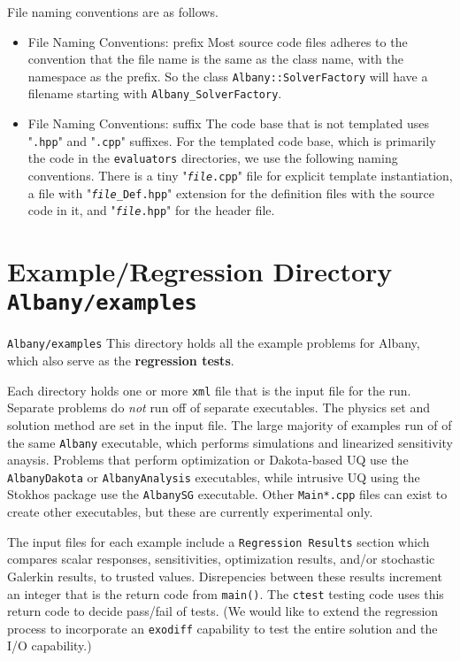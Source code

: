 \documentclass[pdf,12pt,report,strict]{SANDreport}
\theoremstyle{remark}
\begin{document}
File naming conventions are as follows.
\begin{itemize}
\item{File Naming Conventions: prefix} Most source code files adheres to the 
convention that the file name is the same as the class name, with the namespace
as the prefix. So the class \texttt{Albany::SolverFactory} will have a filename
starting with \texttt{Albany\_SolverFactory}.

\item{File Naming Conventions: suffix} The code base that is not templated uses
"\texttt{.hpp}" and "\texttt{.cpp}" suffixes. For the templated code base, which is primarily the
code in the \texttt{evaluators} directories, we use the following naming conventions.
There is a tiny "\texttt{{\em file}.cpp}" file for
explicit template instantiation, a file with "\texttt{{\em file}\_Def.hpp}" extension
for the definition files with the source code in it, and "\texttt{{\em file}.hpp}" for
the header file.

\end{itemize}

\section{Example/Regression Directory \texttt{Albany/examples} }
\texttt{Albany/examples} This directory holds all the example problems for Albany, which 
also serve as the \textbf{regression tests}. 

Each directory holds one or more \texttt{xml} file that is
the input file for the run. Separate problems do {\em not} run off of separate executables. 
The physics set and solution method are set in the input file. The
large majority of examples run of of the same \texttt{Albany} executable, which performs simulations and
linearized sensitivity anaysis. Problems that perform optimization or Dakota-based UQ 
use the \texttt{AlbanyDakota} or \texttt{AlbanyAnalysis} executables, while intrusive UQ
using the Stokhos package use the \texttt{AlbanySG} executable. Other \texttt{Main*.cpp} files
can exist to create other executables, but these are currently experimental only.

The input files for each example include a \texttt{Regression Results} section which 
compares scalar responses, sensitivities, optimization results, and/or stochastic Galerkin
results, to trusted values. Disrepencies between these results increment an integer that
is the return code from \texttt{main()}. The \texttt{ctest} testing code uses this return
code to decide pass/fail of tests. (We would like to extend the regression process to
incorporate an \texttt{exodiff} capability to test the entire solution and the I/O 
capability.)
\end{document}
